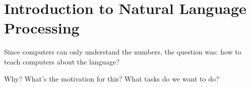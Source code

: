 \chapter{Introduction to Natural Language Processing}

Since computers can only understand the numbers, the question was: how to teach computers about the language?

Why? What's the motivation for this? What tasks do we want to do?







